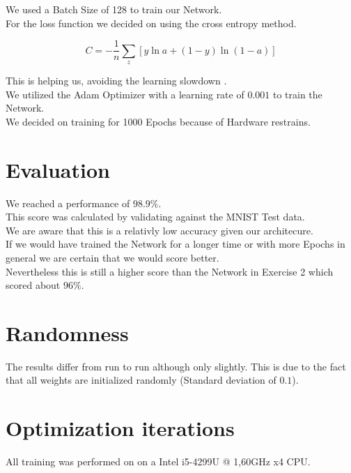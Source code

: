 \documentclass[twoside, twocolumn]{article}
\begin{document}
We used a Batch Size of 128 to train our Network. \\
For the loss function we decided on using the cross entropy method.

\begin{equation}
 C = - \dfrac{1}{n} \sum_{z} [y \ln a + (1 - y) \ln (1 - a)]
\end{equation}

This is helping us, avoiding the learning slowdown \cite{crossentro}.\\
We utilized the Adam Optimizer with a learning rate of $0.001$ to train the Network. \\
We decided on training for 1000 Epochs because of Hardware restrains.


\section{Evaluation}
We reached a performance of $98.9\%$.\\
This score was calculated by validating against the MNIST Test data.\\
We are aware that this is a relativly low accuracy given our architecure.\\
If we would have trained the Network for a longer time or with more Epochs in general we are certain that we would score better.\\
Nevertheless this is still a higher score than the Network in Exercise 2 which scored about $96\%$.\\



\section{Randomness}

The results differ from run to run although only slightly. This is due to the fact that all weights are initialized randomly (Standard deviation of $0.1$).


\section{Optimization iterations}

All training was performed on on a Intel i5-4299U @ 1,60GHz x4 CPU.
\end{document}
